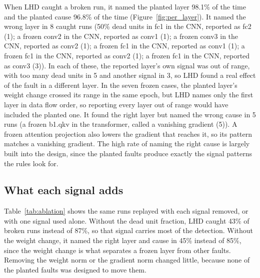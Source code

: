 \documentclass[11pt]{article}
\begin{document}
When LHD caught a broken run, it named the planted layer 98.1\% of the time and the planted cause 96.8\% of the time (Figure~\ref{fig:per_layer}). It named the wrong layer in 8 caught runs (50\% dead units in fc1 in the CNN, reported as fc2 (1); a frozen conv2 in the CNN, reported as conv1 (1); a frozen conv3 in the CNN, reported as conv2 (1); a frozen fc1 in the CNN, reported as conv1 (1); a frozen fc1 in the CNN, reported as conv2 (1); a frozen fc1 in the CNN, reported as conv3 (3)). In each of these, the reported layer's own signal was out of range, with too many dead units in 5 and another signal in 3, so LHD found a real effect of the fault in a different layer. In the seven frozen cases, the planted layer's weight change crossed its range in the same epoch, but LHD names only the first layer in data flow order, so reporting every layer out of range would have included the planted one. It found the right layer but named the wrong cause in 5 runs (a frozen b1.qkv in the transformer, called a vanishing gradient (5)). A frozen attention projection also lowers the gradient that reaches it, so its pattern matches a vanishing gradient. The high rate of naming the right cause is largely built into the design, since the planted faults produce exactly the signal patterns the rules look for.

\subsection{What each signal adds}

Table~\ref{tab:ablation} shows the same runs replayed with each signal removed, or with one signal used alone. Without the dead unit fraction, LHD caught 43\% of broken runs instead of 87\%, so that signal carries most of the detection. Without the weight change, it named the right layer and cause in 45\% instead of 85\%, since the weight change is what separates a frozen layer from other faults. Removing the weight norm or the gradient norm changed little, because none of the planted faults was designed to move them.
\end{document}
